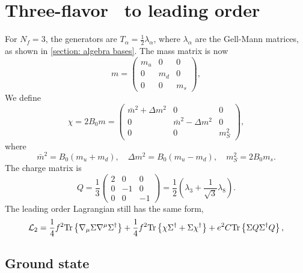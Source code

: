 \section{Three-flavor \chpt\ to leading order}
\label{section: three-flavor chpt to leading order}

For $N_f = 3$, the generators are $T_\alpha = \frac{1}{2} \lambda_\alpha$, where $\lambda_\alpha$ are the Gell-Mann matrices, as shown in \autoref{section: algebra bases}.
The mass matrix is now
%
\begin{equation}
    m = 
    \begin{pmatrix}
        m_u & 0 & 0 \\
        0 & m_d & 0 \\
        0 & 0 & m_s
    \end{pmatrix},
\end{equation}
%
We define 
%
%
\begin{equation}
    \chi = 2B_0 m = 
    \begin{pmatrix}
        \bar m^2 + \Delta m^2 & 0 &0\\
        0& \bar m^2 - \Delta m^2 & 0 \\
        0&0&m_S^2
    \end{pmatrix},
\end{equation}
%
where
%
\begin{equation}
    \bar m^2 =  B_0(m_u + m_d),\quad 
    \Delta m^2 = B_0(m_u - m_d), \quad
    m_S^2 = 2B_0 m_s.
\end{equation}
%
The charge matrix is
%
\begin{equation}
    Q = \frac{1}{3}
    \begin{pmatrix}
        2 & 0 & 0\\
        0 & -1 & 0\\
        0 & 0 & -1
    \end{pmatrix}
    = \frac{1}{2} \left( \lambda_3 + \frac{1}{\sqrt{3}} \lambda_8 \right).
\end{equation}
%
The leading order Lagrangian still has the same form,
%
\begin{equation}
    \label{leading order three-flavor lagrangian}
    \mathcal{L}_2 
    = \frac{1}{4}f^2 \text{Tr} \left\{ \nabla_\mu \Sigma \nabla^\mu \Sigma^\dagger \right\}
    + \frac{1}{4}f^2 \text{Tr} \left\{ \chi \Sigma^\dagger + \Sigma \chi^\dagger \right\}
    + e^2 C \text{Tr} \left\{ \Sigma Q \Sigma^\dagger Q \right\},
\end{equation}
%


\subsection{Ground state}

